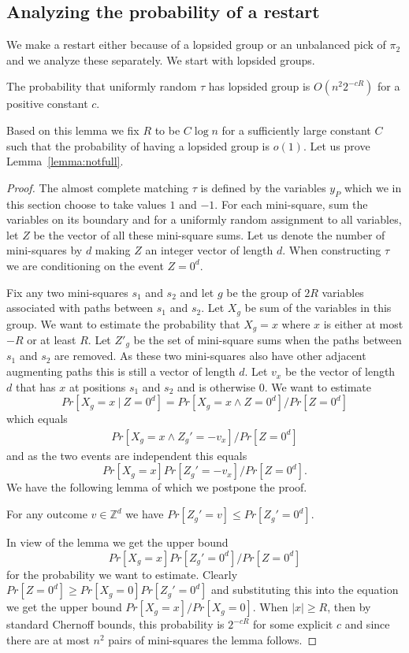 \documentclass{article}\usepackage[a4paper,margin=20mm]{geometry}
\begin{document}
\subsection{Analyzing the probability of a restart}

We make a restart either because of a lopsided
group or an unbalanced pick of $\pi_2$ and we analyze
these separately.  We start with lopsided groups.

\begin{lemma}\label{lemma:notfull}
The probability that uniformly random 
$\tau$ has lopsided group is $O(n^2 2^{-cR})$
for a positive constant $c$.
\end{lemma}

Based on this lemma we fix $R$ to be $C \log n$ for
a sufficiently large constant $C$ such that the probability of 
having a lopsided group is $o(1)$.  Let us
prove Lemma~\ref{lemma:notfull}.

\begin{proof}
The almost complete matching $\tau$ is defined by the 
variables $y_P$ which we in this section choose
to take values $1$ and $-1$.  For each mini-square, sum the variables
on its boundary and for a uniformly random assignment to
all variables, let $Z$ be the vector of all these mini-square sums.
Let us denote the number of mini-squares by $d$ making
$Z$ an integer  vector of length $d$. 
When constructing $\tau$ we are conditioning on the event $Z=0^d$.

Fix any two mini-squares $s_1$ and $s_2$ and let
$g$ be the group of $2R$ variables associated with
paths between $s_1$ and $s_2$.
Let $X_g$ be sum of the variables
in this group.  We want to estimate
the probability that $X_g= x$ where $x$ is
either at most $-R$ or at least $R$.  Let $Z'_g$ be the set of mini-square
sums when the paths between $s_1$ and $s_2$ are
removed.  As these two mini-squares also have other
adjacent augmenting paths this is still a vector of
length $d$.  Let $v_x$ be the
vector of length $d$ that has $x$ at positions $s_1$ and $s_2$
and is otherwise $0$.  We want to estimate
$$
Pr[X_g=x \ |\ Z=0^d]=Pr[X_g=x \land Z=0^d]/Pr[Z=0^d]
$$
which equals
\begin{eqnarray*} 
 Pr[X_g=x \land Z_g'= -v_x]/Pr[Z=0^d]
\end{eqnarray*}
and as the two events are independent this equals
$$
Pr[X_g=x] Pr[Z_g'= -v_x]/Pr[Z=0^d].
$$
We have the following
lemma of which we postpone the proof.

\begin{lemma}\label{lemma:max0}
For any outcome $v \in \mathbb{Z}^d$ we have
$Pr[Z_g'=v] \leq Pr[Z_g'=0^d]$.  
\end{lemma}

In view of the lemma we get the upper bound
$$Pr[X_g=x] Pr[Z_g'= 0^d]/Pr[Z=0^d]
$$
for the probability we want to estimate.
Clearly $Pr[Z=0^d] \geq Pr[X_g=0] Pr[Z_g'= 0^d]$
and substituting this into the equation we get
the upper bound $Pr[X_g=x] / Pr [X_g=0]$.
When $|x| \geq R$, then by standard Chernoff bounds,
this probability is $2^{-cR}$
for some explicit $c$ and since there are at
most $n^2$ pairs of mini-squares the lemma follows.
\end{proof}
\end{document}
